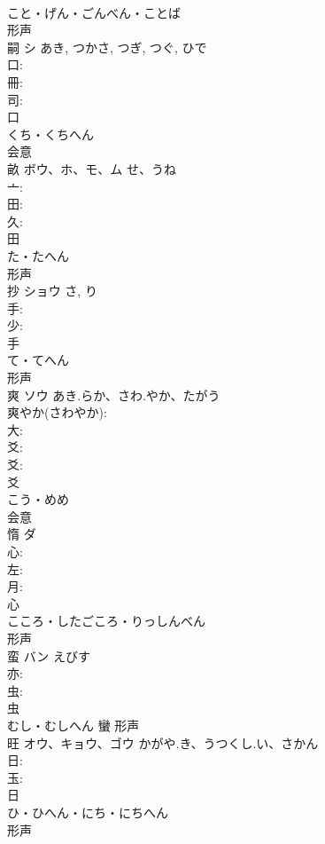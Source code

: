 \documentclass[8pt]{extreport}
\begin{document}
\begin{CJK}{UTF8}{min}
\\	こと・げん・ごんべん・ことば	
\\	形声 
\\	嗣	シ		あき, つかさ, つぎ, つぐ, ひで	
\\	口: 
\\	冊: 
\\	司: 
\\	口	
\\	くち・くちへん	
\\	会意 
\\	畝	ボウ、ホ、モ、ム	せ、うね		
\\	亠: 
\\	田: 
\\	久: 
\\	田	
\\	た・たへん	
\\	形声 
\\	抄	ショウ		さ, り	
\\	手: 
\\	少: 
\\	手	
\\	て・てへん	
\\	形声 
\\	爽	ソウ	あき.らか、さわ.やか、たがう		
\\	爽やか(さわやか): 
\\	大: 
\\	爻: 
\\	爻: 
\\	爻	
\\	こう・めめ	
\\	会意 
\\	惰	ダ			
\\	心: 
\\	左: 
\\	月: 
\\	心	
\\	こころ・したごころ・りっしんべん	
\\	形声 
\\	蛮	バン	えびす		
\\	亦: 
\\	虫: 
\\	虫	
\\	むし・むしへん	蠻	形声 
\\	旺	オウ、キョウ、ゴウ	かがや.き、うつくし.い、さかん		
\\	日: 
\\	玉: 
\\	日	
\\	ひ・ひへん・にち・にちへん	
\\	形声 

\end{CJK}
\end{document}
